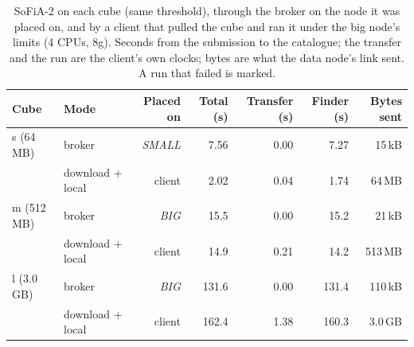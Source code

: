 \begin{table}
\centering
\caption{SoFiA-2 on each cube (same threshold), through the broker on the node it was placed on, and by a client that pulled the cube and ran it under the big node's limits (4 CPUs, 8g). Seconds from the submission to the catalogue; the transfer and the run are the client's own clocks; bytes are what the data node's link sent. A run that failed is marked.}
\label{tab:finder}
\small
\begin{tabular*}{\linewidth}{@{\extracolsep{\fill}}llrrrrr}
\toprule
Cube & Mode & Placed on & Total (s) & Transfer (s) & Finder (s) & Bytes sent \\
\midrule
s (64\,MB) & broker & \emph{SMALL} & 7.56 & 0.00 & 7.27 & 15\,kB \\
 & download + local & client & 2.02 & 0.04 & 1.74 & 64\,MB \\
\addlinespace
m (512\,MB) & broker & \emph{BIG} & 15.5 & 0.00 & 15.2 & 21\,kB \\
 & download + local & client & 14.9 & 0.21 & 14.2 & 513\,MB \\
\addlinespace
l (3.0\,GB) & broker & \emph{BIG} & 131.6 & 0.00 & 131.4 & 110\,kB \\
 & download + local & client & 162.4 & 1.38 & 160.3 & 3.0\,GB \\
\bottomrule
\end{tabular*}
\end{table}
